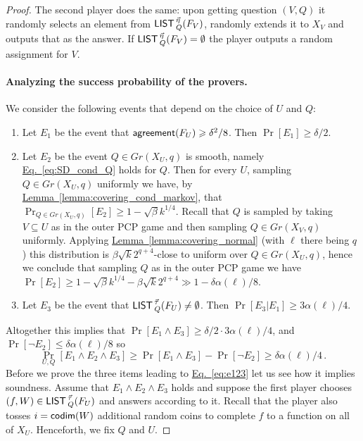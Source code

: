 \documentclass[11pt]{article}
\numberwithin{equation}{section}
\theoremstyle{definition}
\theoremstyle{plain}
\newcommand{\expref}[2]{\hyperref[#2]{#1~\ref{#2}}}
\newcommand{\expeqref}[2]{\hyperref[#2]{#1~\eqref{#2}}}
\newcommand\Prob[2]{{\Pr_{#1}\left[ {#2} \right]}}
\newcommand*\codimm{{\sf codim}}
\renewcommand\ge{\geqslant}
\renewcommand\le{\leqslant}
\def\M{{\sf LIST\,}}
\def\agr{{\sf agreement}}
\begin{document}
\begin{proof}
The second player does the same: upon getting question $(V,Q)$ it randomly selects an element from $\M^{\vec\eta}_Q(F_V)$, randomly extends it to $X_V$ and outputs that as the answer. If $\M^{\vec\eta}_Q(F_V)=\emptyset$ the player outputs a random assignment for $V$.



\paragraph{Analyzing the success probability of the provers.}
%
We consider the following events that depend on the choice of $U$ and $Q$:
\begin{enumerate}
\item Let $E_1$ be the event that $\agr(F_U) \ge \delta^2/8$. Then $\Pr[E_1] \ge \delta/2$.
\item Let $E_2$ be the event $Q \in Gr(X_U,q)$ is smooth, namely \expeqref{Eq.}{eq:SD_cond_Q} holds for $Q$.
%
Then for every $U$, sampling $Q\in Gr(X_U,q)$ uniformly we have, by \expref{Lemma}{lemma:covering_cond_markov},  %
that
$\Pr_{Q\in Gr(X_U,q)}[E_2] \ge 1-\sqrt{\beta} k^{1/4}$.
Recall that $Q$ is sampled by taking $V\subseteq U$ as in the outer PCP game and then sampling $Q\in Gr(X_V,q)$ uniformly.
Applying \expref{Lemma}{lemma:covering_normal} (with $\ell$ there being $q$) this distribution is
$\beta \sqrt{k}2^{q+4}$-close to uniform over $Q\in Gr(X_U,q)$, hence we conclude that sampling
$Q$ as in the outer PCP game we have
$\Pr[E_2] \ge 1-\sqrt{\beta} k^{1/4}-\beta\sqrt{k}2^{q+4}\gg 1-\delta\alpha(\ell)/8$.

\item Let $E_3$ be the event that $\M_Q^{\vec\tau}(F_U)\neq \emptyset$. Then $\Pr[E_3|E_1] \ge 3\alpha(\ell)/4$.
\end{enumerate}
Altogether this implies that $\Pr[E_1 \wedge E_3] \ge \delta/2 \cdot 3\alpha(\ell)/4$, and
$\Pr[\neg E_2] \le \delta\alpha(\ell)/8$ so
\begin{equation}\label{eq:e123}
\Prob{U,Q}{E_1\wedge E_2\wedge E_3} \ge \Pr[E_1 \wedge E_3] - \Pr[\neg E_2] \ge \delta\alpha(\ell)/4\,.
\end{equation}
Before we prove the three items leading to \expeqref{Eq.}{eq:e123} let us see
how it implies soundness.  Assume that $E_1\wedge E_2\wedge E_3$ holds
and suppose the first player chooses $(f,W)\in \M^{\vec\tau}_Q(F_U)$
and answers according to it. Recall that the player also tosses
$i=\codimm(W)$ additional random coins to complete $f$ to a function on
all of $X_U$. Henceforth, we fix $Q$ and $U$.


\end{proof}
\end{document}
